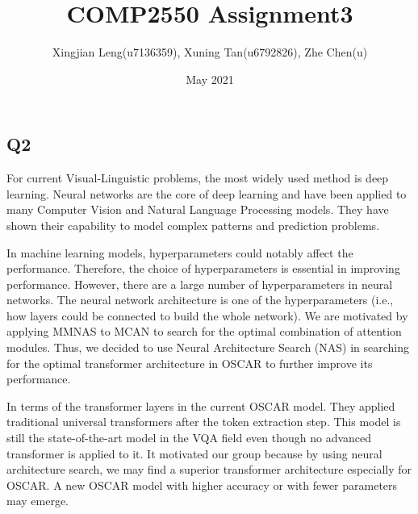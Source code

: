 \documentclass[12pt, a4paper]{article}
\title{COMP2550 Assignment3}
\author{Xingjian Leng(u7136359), Xuning Tan(u6792826), Zhe Chen(u)}
\date{May 2021}
\begin{document}
    
\maketitle

\subsection*{Q2}

\par\noindent For current Visual-Linguistic problems, the most widely used method is deep learning. Neural networks are the core of deep learning and have been applied to many Computer Vision and Natural Language Processing models. They have shown their capability to model complex patterns and prediction problems.

\par\noindent \newline In machine learning models, hyperparameters could notably affect the performance. Therefore, the choice of hyperparameters is essential in improving performance. However, there are a large number of hyperparameters in neural networks. The neural network architecture is one of the hyperparameters (i.e., how layers could be connected to build the whole network). We are motivated by applying MMNAS \cite{DBLP:journals/corr/abs-2004-12070} to MCAN \cite{DBLP:journals/corr/abs-1906-10770} to search for the optimal combination of attention modules. Thus, we decided to use Neural Architecture Search (NAS) in searching for the optimal transformer architecture in OSCAR \cite{DBLP:journals/corr/abs-2004-06165} to further improve its performance.

\par\noindent \newline In terms of the transformer layers in the current OSCAR \cite{DBLP:journals/corr/abs-2004-06165} model. They applied traditional universal transformers \cite{DBLP:journals/corr/VaswaniSPUJGKP17} after the token extraction step. This model is still the state-of-the-art model in the VQA field even though no advanced transformer is applied to it. It motivated our group because by using neural architecture search, we may find a superior transformer architecture especially for OSCAR. A new OSCAR model with higher accuracy or with fewer parameters may emerge.



\end{document}
